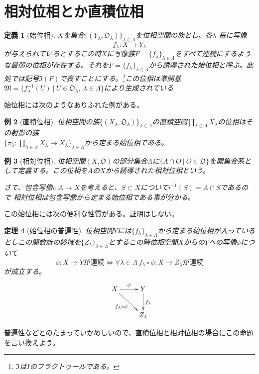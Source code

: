 \documentclass[leqno]{jsarticle}
\newtheorem{thm}{定理}
\newtheorem{df}[thm]{定義}
\newtheorem{exam}[thm]{例}
\newcommand{\dpst}{\displaystyle}
\begin{document}
\section{相対位相とか直積位相}

\begin{df}[始位相]
$X$を集合$\{(Y_{\lambda},\mathfrak{O}_{\lambda})\}_{\lambda \in \Lambda}$を位相空間の族とし、各$\lambda$ 毎に写像
\[
f_{\lambda}:X\rightarrow Y_{\lambda}
\]が与えられているとするこの時$X$に写像族$F=\{f_{\lambda}\}_{\lambda \in \Lambda}$をすべて連続にするような最弱の位相が存在する。それを$F=\{f_{\lambda}\}_{\lambda \in \Lambda}$から誘導された始位相と呼ぶ。此処では記号$\mathfrak{I}(F)$で表すことにする。\footnote{$\mathfrak{I}$は$I$のフラクトゥールである。}この位相は準開基$\mathfrak{M}=\{f_{\lambda}^{-1}(U)\ |\ U\in \mathfrak{O}_{\lambda},\ \lambda\in \Lambda \}$により生成されている
\end{df}
始位相には次のようなありふれた例がある。
\begin{exam}[直積位相]
位相空間の族$\{(X_{\lambda},\mathfrak{O}_{\lambda})\}_{\lambda \in \Lambda}$の直積空間$\displaystyle \prod_{\lambda \in \Lambda}X_{\lambda}$の位相はその射影の族\\
$\dpst \{\pi_{\lambda}:\prod_{\lambda \in \Lambda}X_{\lambda}\to X_{\lambda}\}_{\lambda \in \Lambda}$から定まる始位相である。
\end{exam}

\begin{exam}[相対位相]
位相空間$(X,\mathfrak{O})$の部分集合$A$に$\{A\cap O\ |\ O\in \mathfrak{O}\}$を開集合系として定義する。この位相を$A$の$X$から誘導された相対位相という。
\par さて、包含写像$i:A\to X$を考えると、$S\subset X$について$i^{-1}(S)=A\cap S$であるので
相対位相は包含写像から定まる始位相である事が分かる。
\end{exam}



この始位相には次の便利な性質がある。証明はしない。
\begin{thm}[始位相の普遍性]位相空間$Y$には$\{f_{\lambda}\}_{\lambda \in \Lambda}$から定まる始位相が入っているとしこの関数族の終域を$\{Z_{\lambda}\}_{\lambda \in \Lambda}$とするこの時位相空間$X$からの$Y$への写像$\phi$について
\[
\phi :X\rightarrow Yが連続\Leftrightarrow \forall \lambda\in \Lambda\ f_{\lambda}\circ \phi
: X\rightarrow Z_{\lambda}が連続
\]が成立する。
\[\xymatrix{
&X \ar[r]^{\phi}\ar[dr]_{f_{\lambda}\circ \phi}& Y\ar[d]^{f_{\lambda}}&\\ 
& & Z_{\lambda}&
}\]
\end{thm}
普遍性などとのたまっていかめしいので、直積位相と相対位相の場合にこの命題を言い換えよう。
\end{document}
